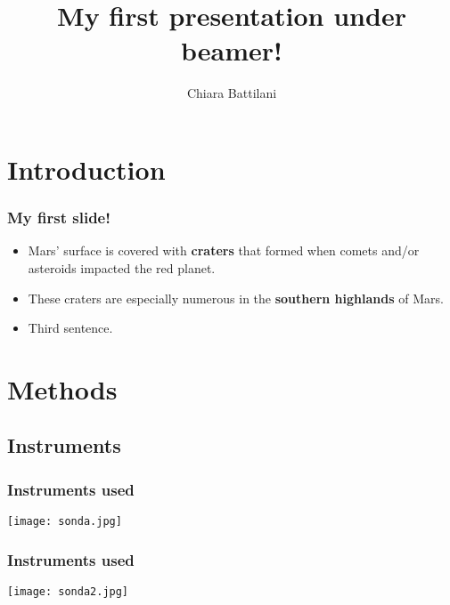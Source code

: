\documentclass{beamer} %
\title{My first presentation under beamer!}
\author{Chiara Battilani}
\begin{document}
\maketitle


\section{Introduction}

\begin{frame}
\frametitle{My first slide!} 
\begin{itemize} %
\item Mars' surface is covered with \textbf{craters} that formed when comets and/or asteroids impacted the red planet.
\item \pause These craters are especially numerous in the \textbf{southern highlands} of Mars. %
\item \pause Third sentence.
\end{itemize}
\end{frame}

\section{Methods}

\subsection{Instruments}

\begin{frame}
\frametitle{Instruments used}
\centering %
\texttt{[image: sonda.jpg]} %
\end{frame}

\begin{frame}
\frametitle{Instruments used}
\centering %
\texttt{[image: sonda2.jpg]} %
\end{frame}
\end{document}
